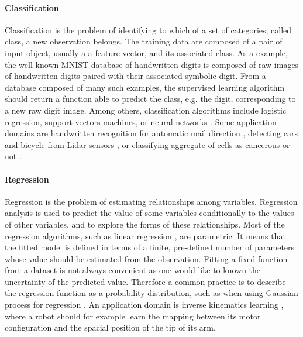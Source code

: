 \paragraph{Classification}

Classification is the problem of identifying to which of a set of categories, called class, a new observation belongs. The training data are composed of a pair of input object, usually a a feature vector, and its associated class. As a example, the well known MNIST database of handwritten digits \cite{lecun1998mnist} is composed of raw images of handwritten digits paired with their associated symbolic digit. From a database composed of many such examples, the supervised learning algorithm should return a function able to predict the class, e.g. the digit, corresponding to a new raw digit image. Among others, classification algorithms include logistic regression, support vectors machines, or neural networks \cite{bishop2006pattern}. Some application domains are handwritten recognition for automatic mail direction \cite{plamondon2000online}, detecting cars and bicycle from Lidar sensors \cite{himmelsbach2008lidar}, or classifying aggregate of cells as cancerous or not \cite{furey2000support}.

\paragraph{Regression} 

Regression is the problem of estimating relationships among variables. Regression analysis is used to predict the value of some variables conditionally to the values of other variables, and to explore the forms of these relationships. Most of the regression algorithms, such as linear regression \cite{bishop2006pattern}, are parametric. It means that the fitted model is defined in terms of a finite, pre-defined number of parameters whose value should be estimated from the observation. Fitting a fixed function from a dataset is not always convenient as one would like to known the uncertainty of the predicted value. Therefore a common practice is to describe the regression function as a probability distribution, such as when using Gaussian process for regression \cite{rasmussen2006gaussian}. An application domain is inverse kinematics learning \cite{d2001learning}, where a robot should for example learn the mapping between its motor configuration and the spacial position of the tip of its arm.


